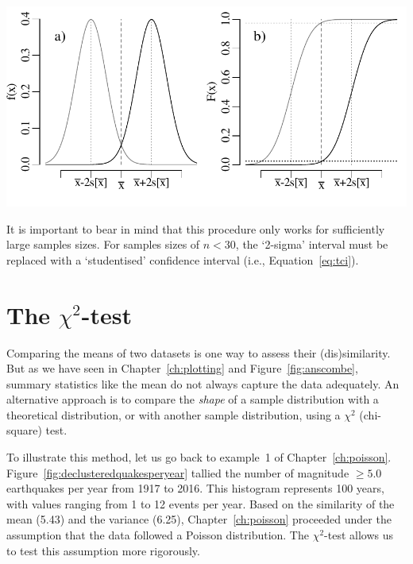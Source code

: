\noindent\begin{minipage}[t][][b]{.6\textwidth}
  \includegraphics[]{../figures/normconf.pdf}\medskip
\end{minipage}
\begin{minipage}[t][][t]{.4\textwidth}
  \label{fig:normconf}
\end{minipage}

It is important to bear in mind that this procedure only works for
sufficiently large samples sizes. For samples sizes of $n<30$, the
`2-sigma' interval must be replaced with a `studentised' confidence
interval (i.e., Equation~\ref{eq:tci}).

\section{The $\chi^2$-test}
\label{sec:chi2}

Comparing the means of two datasets is one way to assess their
(dis)similarity. But as we have seen in Chapter~\ref{ch:plotting} and
Figure~\ref{fig:anscombe}, summary statistics like the mean do not
always capture the data adequately. An alternative approach is to
compare the \emph{shape} of a sample distribution with a theoretical
distribution, or with another sample distribution, using a $\chi^2$
(chi-square) test.\medskip

To illustrate this method, let us go back to example~1 of
Chapter~\ref{ch:poisson}. Figure~\ref{fig:declusteredquakesperyear}
tallied the number of magnitude $\geq{5.0}$ earthquakes per year from
1917 to 2016.  This histogram represents 100 years, with values
ranging from 1 to 12 events per year. Based on the similarity of the
mean (5.43) and the variance (6.25), Chapter~\ref{ch:poisson}
proceeded under the assumption that the data followed a Poisson
distribution.  The $\chi^2$-test allows us to test this assumption
more rigorously.\medskip

